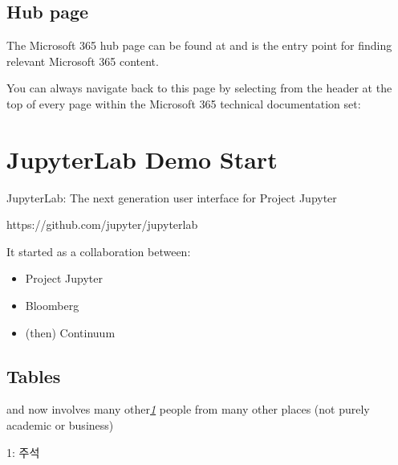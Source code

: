 \documentclass[letterpaper,10pt,english]{sphinxmanual}
\begin{document}
\section{Hub page}
\label{\detokenize{markdown:hub-page}}
The Microsoft 365 hub page can be found at  and is the entry point for finding relevant Microsoft 365 content.

You can always navigate back to this page by selecting  from the header at the top of every page within the Microsoft 365 technical documentation set:


\chapter{JupyterLab Demo Start}
\label{\detokenize{markdown:jupyterlab-demo-start}}
JupyterLab: The next generation user interface for Project Jupyter

https://github.com/jupyter/jupyterlab

It started as a collaboration between:
\begin{itemize}
\item {} 
Project Jupyter

\item {} 
Bloomberg

\item {} 
(then) Continuum

\end{itemize}




\section{Tables}
\label{\detokenize{markdown:tables}}


and now involves many other{\hyperref[\detokenize{markdown:footnote_1}]{\emph{1}}}  people from many other places (not purely academic or business)

1: 주석

\begin{sphinxVerbatim}[commandchars=\\\{\}]
  
   
\end{sphinxVerbatim}
\end{document}
